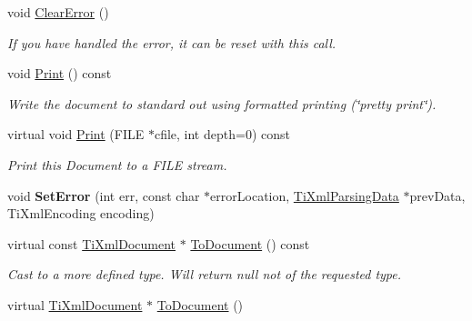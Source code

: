 \begin{DoxyCompactItemize}
\item 
void \hyperlink{class_ti_xml_document_ac66b8c28db86363315712a3574e87c35}{Clear\+Error} ()
\begin{DoxyCompactList}\small\item\em If you have handled the error, it can be reset with this call. \end{DoxyCompactList}\item 
void \hyperlink{class_ti_xml_document_af08389ec70ee9b2de7f800e206a18510}{Print} () const 
\begin{DoxyCompactList}\small\item\em Write the document to standard out using formatted printing (\char`\"{}pretty print\char`\"{}). \end{DoxyCompactList}\item 
virtual void \hyperlink{class_ti_xml_document_a7b1aea204fee266b70b9c105c8bf2ada}{Print} (F\+I\+LE $\ast$cfile, int depth=0) const \hypertarget{class_ti_xml_document_a7b1aea204fee266b70b9c105c8bf2ada}{}\label{class_ti_xml_document_a7b1aea204fee266b70b9c105c8bf2ada}

\begin{DoxyCompactList}\small\item\em Print this Document to a F\+I\+LE stream. \end{DoxyCompactList}\item 
void {\bfseries Set\+Error} (int err, const char $\ast$error\+Location, \hyperlink{class_ti_xml_parsing_data}{Ti\+Xml\+Parsing\+Data} $\ast$prev\+Data, Ti\+Xml\+Encoding encoding)\hypertarget{class_ti_xml_document_a735c23e318597b920c94eae77fa206de}{}\label{class_ti_xml_document_a735c23e318597b920c94eae77fa206de}

\item 
virtual const \hyperlink{class_ti_xml_document}{Ti\+Xml\+Document} $\ast$ \hyperlink{class_ti_xml_document_a1dc977bde3e4fe85a8eb9d88a35ef5a4}{To\+Document} () const \hypertarget{class_ti_xml_document_a1dc977bde3e4fe85a8eb9d88a35ef5a4}{}\label{class_ti_xml_document_a1dc977bde3e4fe85a8eb9d88a35ef5a4}

\begin{DoxyCompactList}\small\item\em Cast to a more defined type. Will return null not of the requested type. \end{DoxyCompactList}\item 
virtual \hyperlink{class_ti_xml_document}{Ti\+Xml\+Document} $\ast$ \hyperlink{class_ti_xml_document_a1025d942a1f328fd742d545e37efdd42}{To\+Document} ()\hypertarget{class_ti_xml_document_a1025d942a1f328fd742d545e37efdd42}{}\label{class_ti_xml_document_a1025d942a1f328fd742d545e37efdd42}


\end{DoxyCompactItemize}

